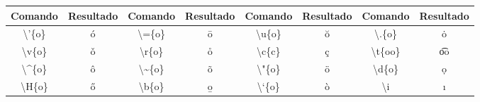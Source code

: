 % 
% 
% 
% 
% 
\begin{tabular}{cc|cc|cc|cc}
    \hline
    Comando & Resultado & Comando & Resultado & Comando & Resultado & Comando & Resultado \\ \hline
    \textbackslash '\{o\} & \'{o} & \textbackslash =\{o\} & \={o} & \textbackslash u\{o\} & \u{o} & \textbackslash .\{o\} & \.{o} \\
    \textbackslash v\{o\} & \v{o} & \textbackslash r\{o\} & \r{o} & \textbackslash c\{c\} & \c{c} & \textbackslash t\{oo\} & \t{oo} \\
    \textbackslash \textasciicircum \{o\} & \^{o} & \textbackslash \textasciitilde \{o\} & \~{o} & \textbackslash "\{o\} & \"{o} & \textbackslash d\{o\} & \d{o} \\
    \textbackslash H\{o\} & \H{o} & \textbackslash b\{o\} & \b{o} & \textbackslash `\{o\} & \`{o} & \textbackslash i & \i \\ \hline
\end{tabular}
